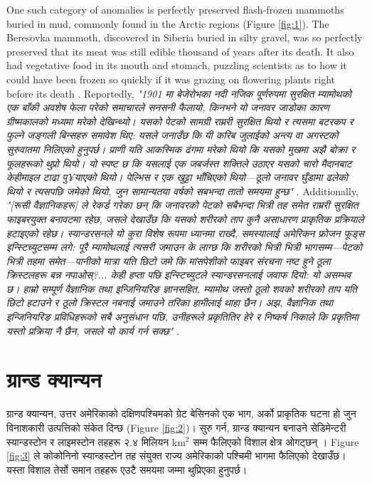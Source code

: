 \documentclass[10pt,twocolumn,letterpaper]{article}
\begin{document}
One such category of anomalies is perfectly preserved flash-frozen mammoths buried in mud, commonly found in the Arctic regions (Figure \ref{fig:1}). The Beresovka mammoth, discovered in Siberia buried in silty gravel, was so perfectly preserved that its meat was still edible thousand of years after its death. It also had vegetative food in its mouth and stomach, puzzling scientists as to how it could have been frozen so quickly if it was grazing on flowering plants right before its death \cite{17}. Reportedly, \textit{"1901 मा बेजेरोभका नदी नजिक पूर्णरुपमा सुरक्षित म्यामोथको एक बाँकी अवशेष फेला परेको समाचारले सनसनी फैलायो, किनभने यो जनावर जाडोका कारण ग्रीष्मकालको मध्यमा मरेको देखिन्थ्यो। यसको पेटको सामग्री राम्ररी सुरक्षित थियो र त्यसमा बटरकप र फुल्ने जङ्गली बिन्सहरु समावेश थिए: यसले जनाउँछ कि यी करिब जुलाईको अन्त्य वा अगस्टको सुरुवातमा निलिएको हुनुपर्छ। प्राणी यति आकस्मिक ढंगमा मरेको थियो कि यसको मुखमा अझै बोक्रा र फूलहरूको थुप्रो थियो। यो स्पष्ट छ कि यसलाई एक जबर्जस्त शक्तिले उठाएर यसको चारो मैदानबाट केहीमाइल टाढा पु¥याएको थियो। पेल्भिस र एक खुट्टा भाँचिएको थियो—ठूलो जनावर घुँडामा ढलेको थियो र त्यसपछि जमेको थियो, जुन सामान्यतया वर्षको सबभन्दा तातो समयमा हुन्छ"} \cite{18}. Additionally, \textit{"[रूसी वैज्ञानिकहरू] ले रेकर्ड गरेका छन् कि जनावरको पेटको सबैभन्दा भित्री तह समेत राम्ररी सुरक्षित फाइबरयुक्त बनावटमा रहेछ, जसले देखाउँछ कि यसको शरीरको ताप कुनै असाधारण प्राकृतिक प्रक्रियाले हटाइएको रहेछ। स्यान्डरसनले यो कुरा विशेष रूपमा ध्यानमा राख्दै, समस्यालाई अमेरिकन फ्रोजन फूड्स इन्स्टिच्युटसम्म लगे: पूरै म्यामोथलाई त्यसरी जमाउन के लाग्छ कि शरीरको भित्री भित्री भागसम्म—पेटको भित्री तहमा समेत—पानीको मात्रा यति छिटो जमे कि मांसपेशीको फाइबर संरचना नष्ट हुने ठूला क्रिस्टलहरू बन्न नपाओस्?... केही हप्ता पछि इन्स्टिच्युटले स्यान्डरसनलाई जवाफ दियो: यो असम्भव छ। हाम्रो सम्पूर्ण वैज्ञानिक तथा इन्जिनियरिङ ज्ञानसहित, म्यामोथ जस्तो ठूलो शवको शरीरको ताप यति छिटो हटाउने र ठूलो क्रिस्टल नबनाई जमाउने तरिका हामीलाई थाहा छैन। अझ, वैज्ञानिक तथा इन्जिनियरिङ प्रविधिहरूको सबै अनुसंधान पछि, उनीहरूले प्रकृतितिर हेरे र निष्कर्ष निकाले कि प्रकृतिमा यस्तो प्रक्रिया नै छैन, जसले यो कार्य गर्न सक्छ"} \cite{19}.

\section{ग्रान्ड क्यान्यन}

ग्रान्ड क्यान्यन, उत्तर अमेरिकाको दक्षिणपश्चिमको ग्रेट बेसिनको एक भाग, अर्को प्राकृतिक घटना हो जुन विनाशकारी उत्पत्तिको संकेत दिन्छ (Figure \ref{fig:2})। सुरु गर्न, ग्रान्ड क्यान्यन बनाउने सेडिमेन्टरी स्यान्डस्टोन र लाइमस्टोन तहहरू २.४ मिलियन km$^2$ सम्म फैलिएको विशाल क्षेत्र ओगट्छन् \cite{21}। Figure \ref{fig:3} ले कोकोनिनो स्यान्डस्टोन तह संयुक्त राज्य अमेरिकाको पश्चिमी भागमा फैलिएको देखाउँछ। यस्ता विशाल तेर्सो समान तहहरू एउटै समयमा जम्मा थुप्रिएका हुनुपर्छ।
\end{document}
